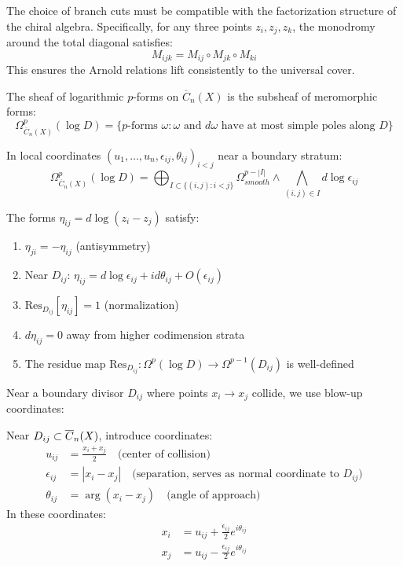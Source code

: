\begin{remark} The choice of branch cuts must be compatible with the factorization structure of the chiral algebra. Specifically, for any three points $z_i, z_j, z_k$, the monodromy around the total diagonal satisfies:
$$M_{ijk} = M_{ij} \circ M_{jk} \circ M_{ki}$$
This ensures the Arnold relations lift consistently to the universal cover.
\end{remark}

\begin{definition}
The sheaf of logarithmic $p$-forms on $\overline{C}_n(X)$ is the subsheaf of meromorphic forms:
$$\Omega^p_{\overline{C}_n(X)}(\log D) = \{p\text{-forms } \omega : \omega \text{ and } d\omega \text{ have at most simple poles along } D\}$$

In local coordinates $(u_1,\ldots,u_n,\epsilon_{ij},\theta_{ij})_{i<j}$ near a boundary stratum:
$$\Omega^p_{\overline{C}_n(X)}(\log D) = \bigoplus_{I \subset \{(i,j): i<j\}} \Omega^{p-|I|}_{smooth} \wedge \bigwedge_{(i,j) \in I} d\log\epsilon_{ij}$$
\end{definition}

\begin{proposition}
The forms $\eta_{ij} = d\log(z_i - z_j)$ satisfy:
\begin{enumerate}
\item $\eta_{ji} = -\eta_{ij}$ (antisymmetry)
\item Near $D_{ij}$: $\eta_{ij} = d\log\epsilon_{ij} + id\theta_{ij} + O(\epsilon_{ij})$
\item $\text{Res}_{D_{ij}}[\eta_{ij}] = 1$ (normalization)
\item $d\eta_{ij} = 0$ away from higher codimension strata
\item The residue map $\text{Res}_{D_{ij}}: \Omega^p(\log D) \to \Omega^{p-1}(D_{ij})$ is well-defined
\end{enumerate}
\end{proposition}

Near a boundary divisor $D_{ij}$ where points $x_i \to x_j$ collide, we use blow-up coordinates:
 
\begin{definition}\label{def:blowup}
Near $D_{ij} \subset \overline{C}_n(X)$, introduce coordinates:
\begin{align}
u_{ij} &= \frac{x_i + x_j}{2} \quad \text{(center of collision)} \\
\epsilon_{ij} &= |x_i - x_j| \quad \text{(separation, serves as normal coordinate to } D_{ij}) \\
\theta_{ij} &= \arg(x_i - x_j) \quad \text{(angle of approach)}
\end{align}
In these coordinates:
\begin{align}
x_i &= u_{ij} + \frac{\epsilon_{ij}}{2}e^{i\theta_{ij}} \\
x_j &= u_{ij} - \frac{\epsilon_{ij}}{2}e^{i\theta_{ij}}
\end{align}
\end{definition}
 
